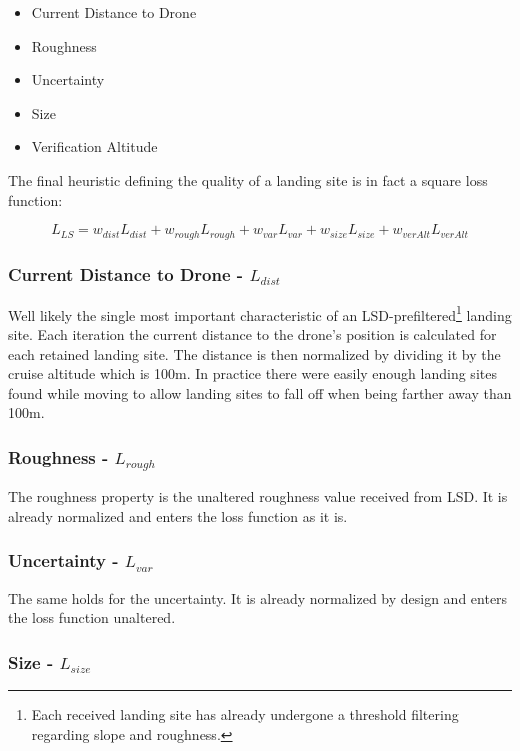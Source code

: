 \begin{itemize}
    \item Current Distance to Drone
    \item Roughness
    \item Uncertainty
    \item Size
    \item Verification Altitude
\end{itemize}

The final heuristic defining the quality of a landing site is in fact a square loss function:

\begin{equation}
    L_{LS} = w_{dist}L_{dist} + w_{rough}L_{rough} + w_{var}L_{var} + w_{size}L_{size} + w_{verAlt}L_{verAlt}
    \label{eq:loss_fct}
\end{equation}

\subsubsection{Current Distance to Drone - $L_{dist}$}
Well likely the single most important characteristic of an LSD-prefiltered\footnote[1]{Each received landing site has already undergone a threshold filtering regarding slope and roughness.} landing site. Each iteration the current distance to the drone's position is calculated for each retained landing site. The distance is then normalized by dividing it by the cruise altitude which is 100m. In practice there were easily enough landing sites found while moving to allow landing sites to fall off when being farther away than 100m.

\subsubsection{Roughness - $L_{rough}$}

The roughness property is the unaltered roughness value received from LSD. It is already normalized and enters the loss function as it is. 

\subsubsection{Uncertainty - $L_{var}$}

The same holds for the uncertainty. It is already normalized by design and enters the loss function unaltered.

\subsubsection{Size - $L_{size}$}

